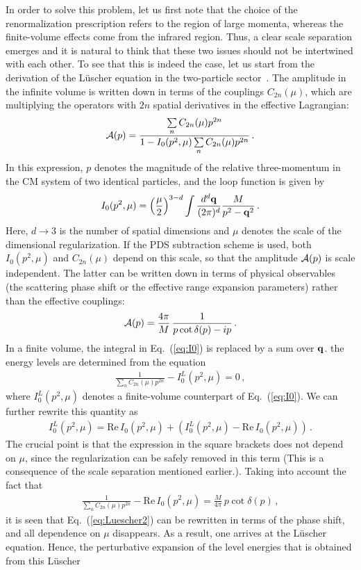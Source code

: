 \documentclass[12pt,prd,tightenlines,nofootinbib]{revtex4-2}
\newcommand{\eq}{\begin{eqnarray}}
\newcommand{\en}{\end{eqnarray}}
\begin{document}
In order to solve this problem, let us first note that the choice of the renormalization
prescription refers to the region of large momenta, whereas the finite-volume effects
come from the infrared region. Thus, a clear scale separation emerges and it is
natural to think that these two issues should not be intertwined with each other.
To see that this is indeed the case, let us start from the derivation of the
L\"uscher equation in the
two-particle sector~\cite{Beane:2003yx}. The amplitude in the infinite volume is
written down in terms of the couplings $C_{2n}(\mu)$, which are multiplying the operators with $2n$ spatial derivatives in the effective Lagrangian:
\eq
{\cal A}(p)=\frac{\sum\limits_nC_{2n}(\mu) p^{2n}}{1-I_0(p^2,\mu)\sum\limits_nC_{2n}(\mu) p^{2n}}\, .
\en
In this expression,
$p$ denotes the magnitude of the relative three-momentum in the CM system of
two identical particles, and the loop function is given by
\eq\label{eq:I0}
I_0(p^2,\mu)=\left(\frac{\mu}{2}\right)^{3-d}\int\frac{d^d{\bf q}}{(2\pi)^d}\frac{M}{p^2-{\bf q}^2}\, .
\en
Here, $d\to 3$ is the number of spatial dimensions and $\mu$ denotes the scale of
the dimensional regularization. If the PDS subtraction scheme is used, both $I_0(p^2,\mu)$
and $C_{2n}(\mu)$ depend on this scale, so that the amplitude ${\cal A}(p)$ is scale independent. The latter can be written down in terms of physical
observables (the scattering phase shift or the effective range expansion parameters)
rather than the effective couplings:
\eq
{\cal A}(p)=\frac{4\pi}{M}\,\frac{1}{p\cot\delta(p)-ip}\, .
\en
In a finite volume, the integral in Eq.~(\ref{eq:I0}) is replaced by a sum over ${\bf q}$.
the energy levels are determined from the equation
\eq\label{eq:Luescher2}
\frac{1}{\sum\limits_nC_{2n}(\mu) p^{2n}}-I_0^L(p^2,\mu)=0\, ,
\en
where $I_0^L(p^2,\mu)$ denotes a finite-volume counterpart of Eq.~(\ref{eq:I0}).
We can further rewrite this quantity as
\eq
I_0^L(p^2,\mu)=\mbox{Re}\,I_0(p^2,\mu)+(I_0^L(p^2,\mu)-\mbox{Re}\,I_0(p^2,\mu))\, .
\en
The crucial point is that the expression in the square brackets does not depend on $\mu$,
since the regularization can be safely removed in this term (This is a consequence of the scale separation mentioned earlier.). Taking into account the fact that
\eq
\frac{1}{\sum\limits_nC_{2n}(\mu) p^{2n}}-\mbox{Re}\,I_0(p^2,\mu)=\frac{M}{4\pi}\,
p\cot\delta(p)\, ,
\en
it is seen that Eq.~(\ref{eq:Luescher2}) can be rewritten in terms of the phase shift,
and all dependence on $\mu$ disappears. As a result, one arrives at the L\"uscher
equation.
Hence, the perturbative expansion of the level energies that is obtained from this L\"uscher
\end{document}
